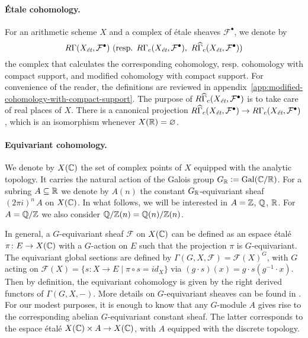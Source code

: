 \documentclass{article}
\numberwithin{equation}{section}
\begin{document}
\paragraph{Étale cohomology.}
For an arithmetic scheme $X$ and a complex of étale sheaves
$\mathcal{F}^\bullet$, we denote by
\[ R\Gamma (X_\et, \mathcal{F}^\bullet) ~
\text{(resp. }R\Gamma_c (X_\et, \mathcal{F}^\bullet), ~
R\widehat{\Gamma}_c (X_\et, \mathcal{F}^\bullet)\text{)} \]
the complex that calculates the corresponding cohomology, resp. cohomology with
compact support, and modified cohomology with compact support. For convenience
of the reader, the definitions are reviewed in
appendix~\ref{app:modified-cohomology-with-compact-support}. The purpose of
$R\widehat{\Gamma}_c (X_\et, \mathcal{F}^\bullet)$ is to take care of real
places of $X$. There is a canonical projection
$R\widehat{\Gamma}_c (X_\et, \mathcal{F}^\bullet) \to R\Gamma_c (X_\et, \mathcal{F}^\bullet)$,
which is an isomorphism whenever $X (\RR) = \emptyset$.

\paragraph{Equivariant cohomology.}
We denote by $X (\CC)$ the set of complex points of $X$ equipped with the
analytic topology. It carries the natural action of the Galois group
$G_\RR \dfn \Gal (\CC/\RR)$. For a subring $A \subseteq \RR$ we denote by
$A (n)$ the constant $G_\RR$-equivariant sheaf $(2\pi i)^n \, A$ on
$X (\CC)$. In what follows, we will be interested in $A = \ZZ$, $\QQ$, $\RR$.
For $A = \QQ/\ZZ$ we also consider $\QQ/\ZZ (n) = \QQ (n)/\ZZ (n)$.

In general, a $G$-equivariant sheaf $\mathcal{F}$ on $X (\CC)$ can be defined as
an espace étalé $\pi\colon E\to X (\CC)$ with a $G$-action on $E$ such that the
projection $\pi$ is $G$-equivariant. The equivariant global sections are defined
by $\Gamma (G,X,\mathcal{F}) = \mathcal{F} (X)^G$, with $G$ acting on
$\mathcal{F} (X) = \{ s\colon X\to E \mid \pi\circ s = id_X \}$ via
$(g\cdot s) (x) = g\cdot s (g^{-1}\cdot x)$. Then by definition, the equivariant
cohomology is given by the right derived functors of $\Gamma (G,X,-)$. More
details on $G$-equivariant sheaves can be found in
\cite[Chapitre~2]{Morin-these}. For our modest purposes, it is enough to know
that any $G$-module $A$ gives rise to the corresponding abelian $G$-equivariant
constant sheaf. The latter corresponds to the espace étalé
$X (\CC)\times A \to X (\CC)$, with $A$ equipped with the discrete topology.
\end{document}
